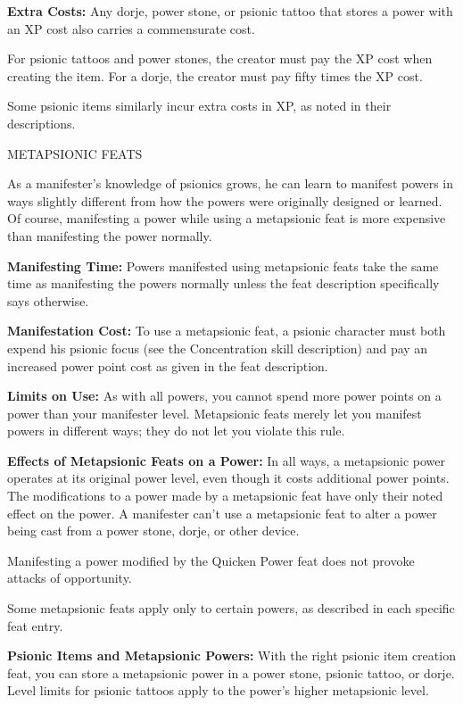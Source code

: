 \documentclass{article}
\begin{document}
\textbf{Extra Costs:} Any dorje, power stone, or psionic tattoo that stores a power 
with an XP cost also carries a commensurate cost. 

For psionic tattoos and power stones, the creator must pay the XP cost when creating 
the item. For a dorje, the creator must pay fifty times the XP cost. 

Some psionic items similarly incur extra costs in XP, as noted in their descriptions.

\vspace{12pt}
METAPSIONIC FEATS

As a manifester's knowledge of psionics grows, he can learn to manifest powers 
in ways slightly different from how the powers were originally designed or learned. 
Of course, manifesting a power while using a metapsionic feat is more expensive 
than manifesting the power normally.

\textbf{Manifesting Time:} Powers manifested using metapsionic feats take the same 
time as manifesting the powers normally unless the feat description specifically 
says otherwise.

\textbf{Manifestation Cost:} To use a metapsionic feat, a psionic character must 
both expend his psionic focus (see the Concentration skill description) and pay 
an increased power point cost as given in the feat description.

\textbf{Limits on Use:} As with all powers, you cannot spend more power points 
on a power than your manifester level. Metapsionic feats merely let you manifest 
powers in different ways; they do not let you violate this rule. 

\textbf{Effects of Metapsionic Feats on a Power:} In all ways, a metapsionic power 
operates at its original power level, even though it costs additional power points. 
The modifications to a power made by a metapsionic feat have only their noted effect 
on the power. A manifester can't use a metapsionic feat to alter a power being 
cast from a power stone, dorje, or other device.

Manifesting a power modified by the Quicken Power feat does not provoke attacks 
of opportunity.

Some metapsionic feats apply only to certain powers, as described in each specific 
feat entry.

\textbf{Psionic Items and Metapsionic Powers:} With the right psionic item creation 
feat, you can store a metapsionic power in a power stone, psionic tattoo, or dorje. 
Level limits for psionic tattoos apply to the power's higher metapsionic level. 
\end{document}
